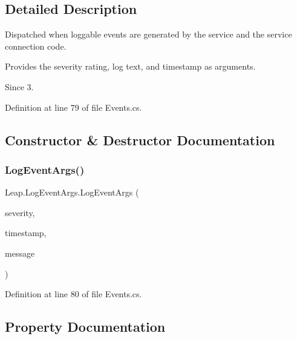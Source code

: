\subsection{Detailed Description}
Dispatched when loggable events are generated by the service and the service connection code. 

Provides the severity rating, log text, and timestamp as arguments. \begin{DoxySince}{Since}
3. 
\end{DoxySince}


Definition at line 79 of file Events.\+cs.



\subsection{Constructor \& Destructor Documentation}
\mbox{\label{class_leap_1_1_log_event_args_aed65277dda9fd3ba3ea898e292c5692c}} 
\subsubsection{\texorpdfstring{LogEventArgs()}{LogEventArgs()}}
{\footnotesize\ttfamily Leap.\+Log\+Event\+Args.\+Log\+Event\+Args (\begin{DoxyParamCaption}\item[{\mbox{\hyperlink{namespace_leap_a4341f6495947222d3a86fcbb0c2b629d}{Message\+Severity}}}]{severity,  }\item[{Int64}]{timestamp,  }\item[{string}]{message }\end{DoxyParamCaption})}



Definition at line 80 of file Events.\+cs.



\subsection{Property Documentation}
\mbox{\label{class_leap_1_1_log_event_args_a39cef7faae94aefecf3b70df160c832e}} 
